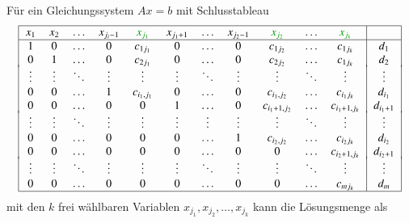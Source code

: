 Für ein Gleichungssystem $Ax=b$ mit Schlusstableau
%
\begin{equation}
\begin{tabular}{|>{$}c<{$}>{$}c<{$}>{$}c<{$}>{$}c<{$}>{$}c<{$}>{$}c<{$}>{$}c<{$}>{$}c<{$}>{$}c<{$}>{$}c<{$}>{$}c<{$}|>{$}c<{$}|}
\hline
   x_1&   x_2&\dots &x_{j_i-1}&{\color{darkgreen}x_{j_1}}&x_{j_1+1}&\dots &x_{j_2-1}&{\color{darkgreen}x_{j_2}}&\dots&{\color{darkgreen}x_{j_k}}& \\
\hline
     1&     0&\dots &        0&c_{1j_1}   &     0&\dots &     0&c_{1j_2}     &\dots &c_{1j_k}     &d_1      \\
     0&     1&\dots &        0&c_{2j_1}   &     0&\dots &     0&c_{2j_2}     &\dots &c_{1j_k}     &d_2      \\[-2pt]
\vdots&\vdots&\ddots&\vdots   &\vdots     &\vdots&\ddots&\vdots&\vdots       &\ddots&\vdots       &\vdots   \\
     0&     0&\dots &        1&c_{i_1,j_1}&     0&\dots &     0&c_{i_1,j_2}  &\dots &c_{i_1j_k}   &d_{i_1}  \\
     0&     0&\dots &        0&          0&     1&\dots &     0&c_{i_1+1,j_2}&\dots &c_{i_1+1,j_k}&d_{i_1+1}\\[-2pt]
\vdots&\vdots&\ddots&\vdots   &\vdots     &\vdots&\vdots&\vdots&\vdots       &\ddots&\vdots       &\vdots   \\
     0&     0&\dots &        0&          0&     0&\dots &     1&c_{i_2,j_2}  &\dots &c_{i_2j_k}   &d_{i_2}  \\
     0&     0&\dots &        0&          0&     0&\dots &     0&            0&\dots &c_{i_2+1,j_k}&d_{i_2+1}\\[-2pt]
\vdots&\vdots&\ddots&\vdots   &\vdots     &\vdots&\ddots&\vdots&\vdots       &\ddots&\vdots       &\vdots   \\
     0&     0&\dots &        0&          0&     0&\dots &     0&            0&\dots &c_{mj_k}     &d_{m}    \\
\hline
\end{tabular}
\end{equation}
mit den $k$ frei wählbaren Variablen
$x_{j_1}, x_{j_2},\dots, x_{j_k}$ kann die Lösungsmenge als
